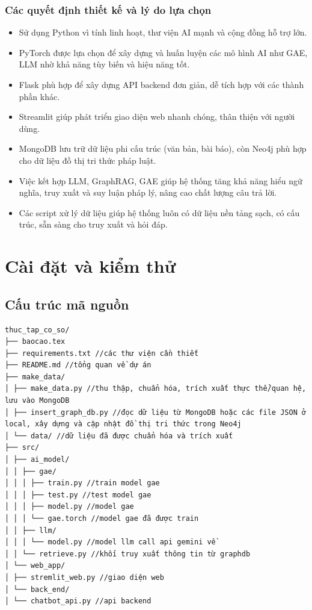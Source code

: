 \documentclass[a4paper]{article}
\begin{document}
\subsubsection{Các quyết định thiết kế và lý do lựa chọn}
\begin{itemize}
    \item Sử dụng Python vì tính linh hoạt, thư viện AI mạnh và cộng đồng hỗ trợ lớn.
    \item PyTorch được lựa chọn để xây dựng và huấn luyện các mô hình AI như GAE, LLM nhờ khả năng tùy biến và hiệu năng tốt.
    \item Flask phù hợp để xây dựng API backend đơn giản, dễ tích hợp với các thành phần khác.
    \item Streamlit giúp phát triển giao diện web nhanh chóng, thân thiện với người dùng.
    \item MongoDB lưu trữ dữ liệu phi cấu trúc (văn bản, bài báo), còn Neo4j phù hợp cho dữ liệu đồ thị tri thức pháp luật.
    \item Việc kết hợp LLM, GraphRAG, GAE giúp hệ thống tăng khả năng hiểu ngữ nghĩa, truy xuất và suy luận pháp lý, nâng cao chất lượng câu trả lời.
    \item Các script xử lý dữ liệu giúp hệ thống luôn có dữ liệu nền tảng sạch, có cấu trúc, sẵn sàng cho truy xuất và hỏi đáp.
\end{itemize}

\newpage
\section{Cài đặt và kiểm thử}
\subsection{Cấu trúc mã nguồn}

\begin{verbatim}
thuc_tap_co_so/
├── baocao.tex
├── requirements.txt //các thư viện cần thiết
├── README.md //tổng quan về dự án
├── make_data/
│ ├── make_data.py //thu thập, chuẩn hóa, trích xuất thực thể/quan hệ, lưu vào MongoDB
│ ├── insert_graph_db.py //đọc dữ liệu từ MongoDB hoặc các file JSON ở local, xây dựng và cập nhật đồ thị tri thức trong Neo4j
│ └── data/ //dữ liệu đã được chuẩn hóa và trích xuất
├── src/
│ ├── ai_model/
│ │ ├── gae/
│ │ │ ├── train.py //train model gae
│ │ │ ├── test.py //test model gae
│ │ │ ├── model.py //model gae
│ │ │ └── gae.torch //model gae đã được train
│ │ ├── llm/
│ │ │ └── model.py //model llm call api gemini về
│ │ └── retrieve.py //khối truy xuất thông tin từ graphdb
│ └── web_app/
│ ├── stremlit_web.py //giao diện web
│ └── back_end/
│ └── chatbot_api.py //api backend
\end{verbatim}
\end{document}
